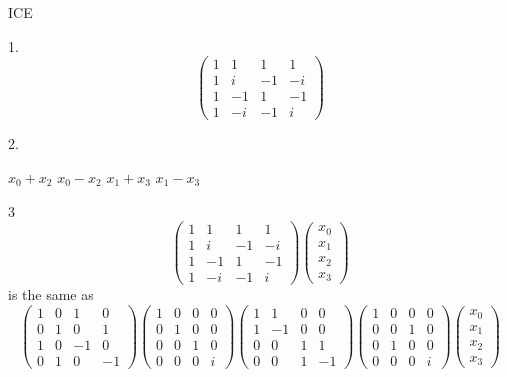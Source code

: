 \documentclass{article}
\begin{document}
ICE

1.
\begin{equation}
	\begin{pmatrix}
		1 & 1 & 1 & 1 \\
		1 & i & -1 & -i \\
		1 & -1 & 1 & -1 \\
		1 & -i & -1 & i
	\end{pmatrix}
\end{equation}

2.

$x_0+x_2$ $x_0-x_2$ $x_1+x_3$ $x_1-x_3$

3
\begin{equation}
	\begin{pmatrix}
		1 & 1 & 1 & 1 \\
		1 & i & -1 & -i \\
		1 & -1 & 1 & -1 \\
		1 & -i & -1 & i
	\end{pmatrix}
\begin{pmatrix}
	x_0 \\
	x_1 \\
	x_2 \\
	x_3
\end{pmatrix}
\end{equation}
is the same as
\begin{equation}
	\begin{pmatrix}
		1 & 0 & 1 & 0 \\
		0 & 1 & 0 & 1 \\
		1 & 0 & -1 & 0 \\
		0 & 1 & 0 & -1
	\end{pmatrix}
	\begin{pmatrix}
		1 & 0 & 0 & 0 \\
		0 & 1 & 0 & 0 \\
		0 & 0 & 1 & 0 \\
		0 & 0 & 0 & i
	\end{pmatrix}
	\begin{pmatrix}
		1 & 1 & 0 & 0 \\
		1 & -1 & 0 & 0 \\
		0 & 0 & 1 & 1 \\
		0 & 0 & 1 & -1
	\end{pmatrix}
	\begin{pmatrix}
		1 & 0 & 0 & 0 \\
		0 & 0 & 1 & 0 \\
		0 & 1 & 0 & 0 \\
		0 & 0 & 0 & i
	\end{pmatrix}
	\begin{pmatrix}
		x_0 \\
		x_1 \\
		x_2 \\
		x_3
	\end{pmatrix}
\end{equation}
\end{document}
